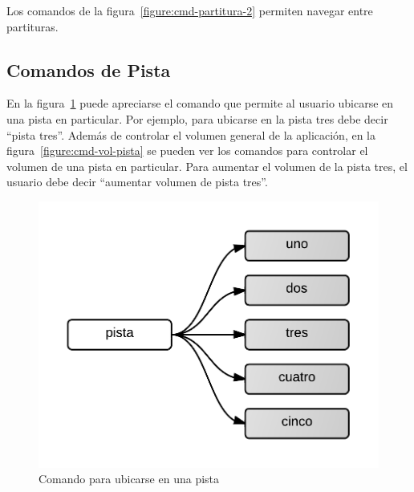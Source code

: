 Los comandos de la figura~\ref{figure:cmd-partitura-2} permiten navegar entre partituras.

\subsection{Comandos de Pista}
En la figura~\ref{figure:cmd-pista-1} puede apreciarse el comando que permite al usuario ubicarse en una pista en particular. Por  
ejemplo, para ubicarse en la pista tres debe decir “pista tres”. Adem\'as de controlar el volumen general de la aplicaci\'on, en 
la figura~\ref{figure:cmd-vol-pista} se pueden ver los comandos para controlar el volumen de una pista en particular. Para aumentar
el volumen de la pista tres, el usuario debe decir ``aumentar volumen de pista tres''.

\begin{figure}[H] 
\centering
\includegraphics[width=0.6\linewidth]{./graphics/cmd-pista-1.png}
\caption{Comando para ubicarse en una pista}
\label{figure:cmd-pista-1}
\end{figure}

